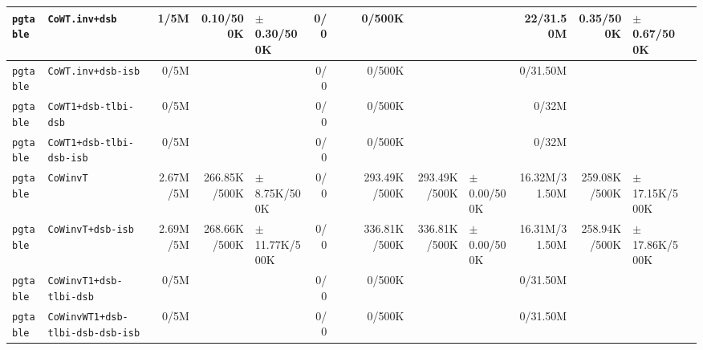 \begin{tabular}{l l  | r r l | r r l | r r l | r r l l}
        \verb|pgtable| &                                        \verb|CoWT.inv+dsb| &           1/5M &             0.10/500K &   $\pm$ 0.30/500K &            0/0 &                       &  &         0/500K &                       &                   &      22/31.50M &             0.35/500K &   $\pm$ 0.67/500K & \\ \hline 
        \verb|pgtable| &                                    \verb|CoWT.inv+dsb-isb| &           0/5M &                       &                   &            0/0 &                       &  &         0/500K &                       &                   &       0/31.50M &                       &                   & \\ \hline 
        \verb|pgtable| &                                  \verb|CoWT1+dsb-tlbi-dsb| &           0/5M &                       &                   &            0/0 &                       &  &         0/500K &                       &                   &          0/32M &                       &                   & \\ \hline 
        \verb|pgtable| &                              \verb|CoWT1+dsb-tlbi-dsb-isb| &           0/5M &                       &                   &            0/0 &                       &  &         0/500K &                       &                   &          0/32M &                       &                   & \\ \hline 
        \verb|pgtable| &                                             \verb|CoWinvT| &       2.67M/5M &          266.85K/500K &  $\pm$ 8.75K/500K &            0/0 &                       &  &   293.49K/500K &          293.49K/500K &   $\pm$ 0.00/500K &  16.32M/31.50M &          259.08K/500K & $\pm$ 17.15K/500K & \\ \hline 
        \verb|pgtable| &                                     \verb|CoWinvT+dsb-isb| &       2.69M/5M &          268.66K/500K & $\pm$ 11.77K/500K &            0/0 &                       &  &   336.81K/500K &          336.81K/500K &   $\pm$ 0.00/500K &  16.31M/31.50M &          258.94K/500K & $\pm$ 17.86K/500K & \\ \hline 
        \verb|pgtable| &                               \verb|CoWinvT1+dsb-tlbi-dsb| &           0/5M &                       &                   &            0/0 &                       &  &         0/500K &                       &                   &       0/31.50M &                       &                   & \\ \hline 
        \verb|pgtable| &                      \verb|CoWinvWT1+dsb-tlbi-dsb-dsb-isb| &           0/5M &                       &                   &            0/0 &                       &  &         0/500K &                       &                   &       0/31.50M &                       &                   & \\ \hline 

\end{tabular}
